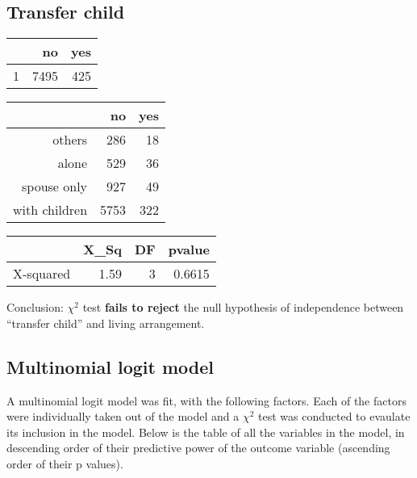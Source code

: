\documentclass[11pt]{article}
\begin{document}
\subsection*{Transfer child}
\begin{table}[ht]
\centering
\begin{tabular}{rrr}
  \hline
 & no & yes \\ 
  \hline
1 & 7495 & 425 \\ 
   \hline
\end{tabular}
\end{table}%
\begin{table}[ht]
\centering
\begin{tabular}{rrr}
  \hline
 & no & yes \\ 
  \hline
others & 286 &  18 \\ 
  alone & 529 &  36 \\ 
  spouse only & 927 &  49 \\ 
  with children & 5753 & 322 \\ 
   \hline
\end{tabular}
\end{table}%
\begin{table}[ht]
\centering
\begin{tabular}{rrrr}
  \hline
 & X\_Sq & DF & pvalue \\ 
  \hline
X-squared & 1.59 & 3 & 0.6615 \\ 
   \hline
\end{tabular}
\end{table}Conclusion: $\chi^2$ test {\bf{fails to reject}} the null hypothesis of independence between ``transfer child'' and living arrangement. 

\newpage
\subsection*{Multinomial logit model}
A multinomial logit model was fit, with the following factors. Each of the factors were individually taken out of the model and a $\chi ^2$ test was conducted to evaulate its inclusion in the model. Below is the table of all the variables in the model, in descending order of their predictive power of the outcome variable (ascending order of their p values). 
\end{document}
